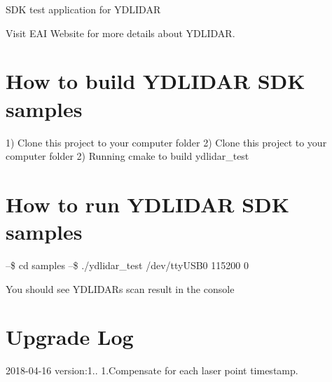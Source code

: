 S\+DK test application for Y\+D\+L\+I\+D\+AR

Visit E\+AI Website for more details about Y\+D\+L\+I\+D\+AR.

\section*{How to build Y\+D\+L\+I\+D\+AR S\+DK samples }

1) Clone this project to your computer folder 2) Clone this project to your computer folder 2) Running cmake to build ydlidar\+\_\+test

\section*{How to run Y\+D\+L\+I\+D\+AR S\+DK samples }

--\$ cd samples --\$ ./ydlidar\+\_\+test /dev/tty\+U\+S\+B0 115200 0

You should see Y\+D\+L\+I\+D\+AR\textquotesingle{}s scan result in the console

\section*{Upgrade Log }

2018-\/04-\/16 version\+:1.. 1.\+Compensate for each laser point timestamp. 
